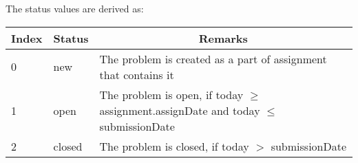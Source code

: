\documentclass{article}
\begin{document}
\begin{enumerate}
The \textsf{status} values are derived as:

\begin{center}
\begin{scriptsize}
\begin{tabular}{|l|l|l|} \hline
\multicolumn{1}{|c}{\bf Index} & \multicolumn{1}{|c}{\bf Status} & \multicolumn{1}{|c|}{\bf Remarks} \\ \hline
0 & new 		& The problem is created as a part of \textsf{assignment} that contains it \\
1 & open 		& The problem is open, if \textsf{today} $\geq$ \textsf{assignment.assignDate} and \textsf{today} $\leq$ \textsf{submissionDate} \\
2 & closed 		& The problem is closed, if \textsf{today} $>$ \textsf{submissionDate} \\ \hline
\end{tabular}
\end{scriptsize}
\end{center}


\end{enumerate}
\end{document}
